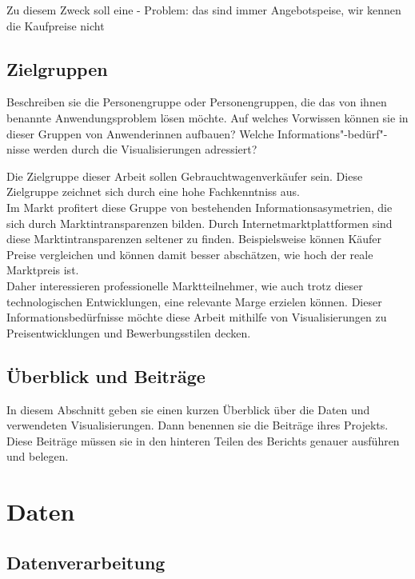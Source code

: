 \documentclass[usegeometry=true]{scrartcl}
\begin{document}
Zu diesem Zweck soll eine
- Problem: das sind immer Angebotspeise, wir kennen die Kaufpreise nicht

\subsection{Zielgruppen}
Beschreiben sie die Personengruppe oder Personengruppen, die das von ihnen benannte Anwendungsproblem lösen möchte. Auf welches Vorwissen können sie in dieser Gruppen von Anwenderinnen aufbauen? Welche Informations"-bedürf"-nisse werden durch die Visualisierungen adressiert?

Die Zielgruppe dieser Arbeit sollen Gebrauchtwagenverkäufer sein. Diese Zielgruppe zeichnet sich durch eine hohe Fachkenntniss aus. \\
Im Markt profitert diese Gruppe von bestehenden Informationsasymetrien, die sich durch Marktintransparenzen bilden. Durch Internetmarktplattformen sind diese Marktintransparenzen seltener zu finden. Beispielsweise können Käufer Preise vergleichen und können damit besser abschätzen, wie hoch der reale Marktpreis ist. \\
Daher interessieren professionelle Marktteilnehmer, wie auch trotz dieser technologischen Entwicklungen, eine relevante Marge erzielen können. 
Dieser Informationsbedürfnisse möchte diese Arbeit mithilfe von Visualisierungen zu Preisentwicklungen und Bewerbungsstilen decken. \\


\subsection{Überblick und Beiträge}
In diesem Abschnitt geben sie einen kurzen Überblick über die Daten und verwendeten Visualisierungen. Dann benennen sie die Beiträge ihres Projekts. Diese Beiträge müssen sie in den hinteren Teilen des Berichts genauer ausführen und belegen.



\section{Daten}

\subsection{Datenverarbeitung}
\end{document}
